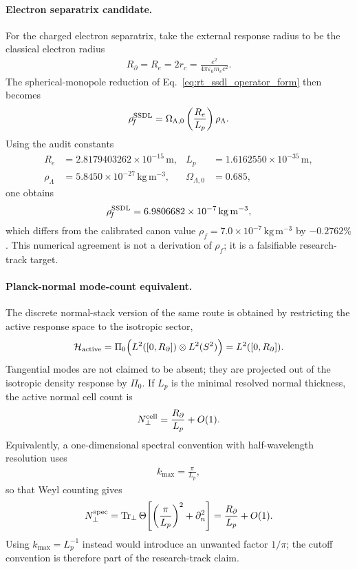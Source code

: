 \paragraph{Electron separatrix candidate.}
For the charged electron separatrix, take the external response radius to
be the classical electron radius
\begin{align}
    R_\partial=R_e=2r_c
    =
    \frac{e^2}{4\pi\varepsilon_0m_ec^2} .
\end{align}
The spherical-monopole reduction of Eq.~\eqref{eq:rt_ssdl_operator_form}
then becomes
\begin{align}
    \rho_{\!f}^{\rm SSDL}
    =
    \Omega_{\Lambda,0}
    \left(\frac{R_e}{L_p}\right)
    \rho_\Lambda .
    \label{eq:rt_ssdl_electron_candidate}
\end{align}
Using the audit constants
\begin{align}
    R_e&=2.8179403262\times10^{-15}\,\mathrm{m},
    &L_p&=1.6162550\times10^{-35}\,\mathrm{m},
    \\
    \rho_\Lambda&=5.8450\times10^{-27}\,\mathrm{kg\,m^{-3}},
    &\Omega_{\Lambda,0}&=0.685,
\end{align}
one obtains
\begin{align}
    \rho_{\!f}^{\rm SSDL}
    =
    6.9806682\times10^{-7}\,\mathrm{kg\,m^{-3}},
\end{align}
which differs from the calibrated canon value
\(\rho_{\!f}=7.0\times10^{-7}\,\mathrm{kg\,m^{-3}}\) by
\(-0.2762\%\).  This numerical agreement is not a derivation of
\(\rho_{\!f}\); it is a falsifiable research-track target.

\paragraph{Planck-normal mode-count equivalent.}
The discrete normal-stack version of the same route is obtained by
restricting the active response space to the isotropic sector,
\begin{align}
    \mathcal H_{\rm active}
    =
    \Pi_0\Big(L^2([0,R_\partial])\otimes L^2(S^2)\Big)
    =
    L^2([0,R_\partial]) .
\end{align}
Tangential modes are not claimed to be absent; they are projected out of
the isotropic density response by \(\Pi_0\).  If \(L_p\) is the minimal
resolved normal thickness, the active normal cell count is
\begin{align}
    N_\perp^{\rm cell}
    =
    \frac{R_\partial}{L_p}+O(1).
\end{align}
Equivalently, a one-dimensional spectral convention with half-wavelength
resolution uses
\begin{align}
    k_{\max}=\frac{\pi}{L_p},
\end{align}
so that Weyl counting gives
\begin{align}
    N_\perp^{\rm spec}
    =
    \operatorname{Tr}_\perp
    \Theta\!\left[
        \left(\frac{\pi}{L_p}\right)^2+\partial_n^2
    \right]
    =
    \frac{R_\partial}{L_p}+O(1).
\end{align}
Using \(k_{\max}=L_p^{-1}\) instead would introduce an unwanted factor
\(1/\pi\); the cutoff convention is therefore part of the research-track
claim.

